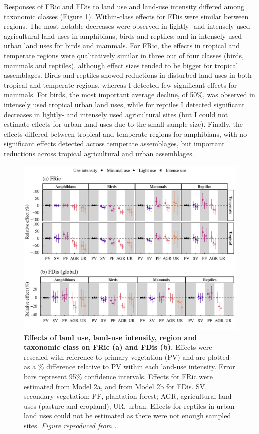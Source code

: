 Responses of FRic and FDis to land use and land-use intensity differed among taxonomic classes (Figure \ref{chap3_fig3}). Within-class effects for FDis were similar between regions. The most notable decreases were observed in lightly- and intensely used agricultural land uses in amphibians, birds and reptiles; and in intensely used urban land uses for birds and mammals. For FRic, the effects in tropical and temperate regions were qualitatively similar in three out of four classes (birds, mammals and reptiles), although effect sizes tended to be bigger for tropical assemblages. Birds and reptiles showed reductions in disturbed land uses in both tropical and temperate regions, whereas I detected few significant effects for mammals. For birds, the most important average decline, of 50\%, was observed in intensely used tropical urban land uses, while for reptiles I detected significant decreases in lightly- and intensely used agricultural sites (but I could not estimate effects for urban land uses due to the small sample size). Finally, the effects differed between tropical and temperate regions for amphibians, with no significant effects detected across temperate assemblages, but important reductions across tropical agricultural and urban assemblages.

\begin{figure}[h!]
\centering
\includegraphics[scale=0.75]{figures/Chapter_FD/Figure3}
\caption[Effects of land use, land-use intensity, region and taxonomic class on FRic (a) and FDis (b).]{\textbf{Effects of land use, land-use intensity, region and taxonomic class on FRic (a) and FDis (b).} Effects were rescaled with reference to primary vegetation (PV) and are plotted as a \% difference relative to PV within each land-use intensity. Error bars represent 95\% confidence intervals. Effects for FRic were estimated from Model 2a, and from Model 2b for FDis. SV, secondary vegetation; PF, plantation forest; AGR, agricultural land uses (pasture and cropland); UR, urban. Effects for reptiles in urban land uses could not be estimated as there were not enough sampled sites. \textit{Figure reproduced from \citet{Etard2021}.}}
\label{chap3_fig3}
\end{figure}

